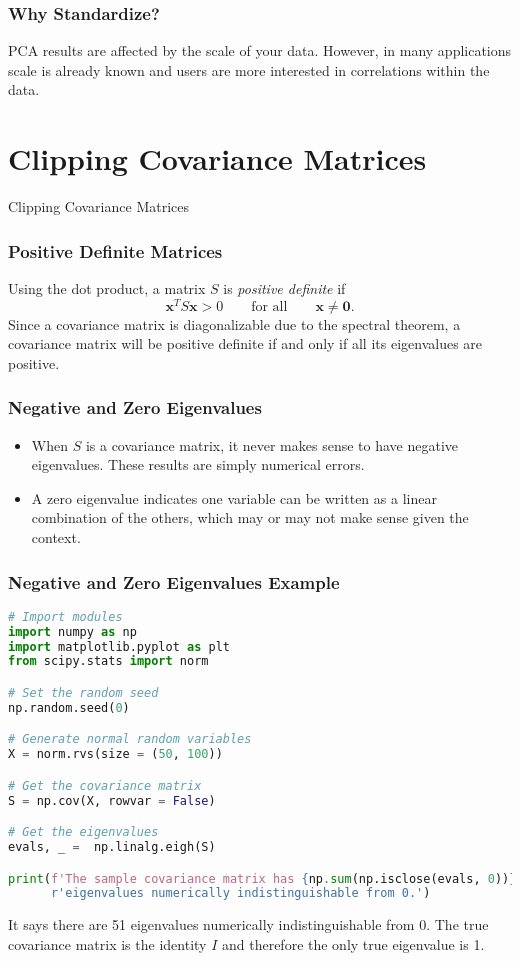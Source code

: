 \documentclass{beamer}
\begin{document}
\begin{frame}
\frametitle{Why Standardize?}
PCA results are affected by the scale of your data. However, in many applications scale is already known and users are more interested in correlations within the data. 
\end{frame}

\section{Clipping Covariance Matrices}

\begin{frame}
\begin{center}
\Huge Clipping Covariance Matrices
\end{center}
\end{frame}

\begin{frame}
\frametitle{Positive Definite Matrices}
Using the dot product, a matrix $S$ is {\it positive definite} if
$$
{\boldsymbol x^T }S {\boldsymbol x} > 0 \qquad\text{for all}\qquad {\boldsymbol x} \neq {\boldsymbol 0}.
$$
Since a covariance matrix is diagonalizable due to the spectral theorem, a covariance matrix will be positive definite if and only if all its eigenvalues are positive.
\end{frame}

\begin{frame}
\frametitle{Negative and Zero Eigenvalues}

\begin{itemize}
\item When $S$ is a covariance matrix, it never makes sense to have negative eigenvalues. These results are simply numerical errors.
\item A zero eigenvalue indicates one variable can be written as a linear combination of the others, which may or may not make sense given the context.
\end{itemize}

\end{frame}

\begin{frame}[fragile]
\frametitle{Negative and Zero Eigenvalues Example}
\begin{lstlisting}[language=Python]
# Import modules
import numpy as np
import matplotlib.pyplot as plt
from scipy.stats import norm

# Set the random seed
np.random.seed(0)

# Generate normal random variables
X = norm.rvs(size = (50, 100))

# Get the covariance matrix
S = np.cov(X, rowvar = False)

# Get the eigenvalues
evals, _ =  np.linalg.eigh(S)

print(f'The sample covariance matrix has {np.sum(np.isclose(evals, 0))}',
      r'eigenvalues numerically indistinguishable from 0.')
\end{lstlisting}

It says there are 51 eigenvalues numerically indistinguishable from 0. The true covariance matrix is the identity $I$ and therefore the only true eigenvalue is 1.
\end{frame}
\end{document}
